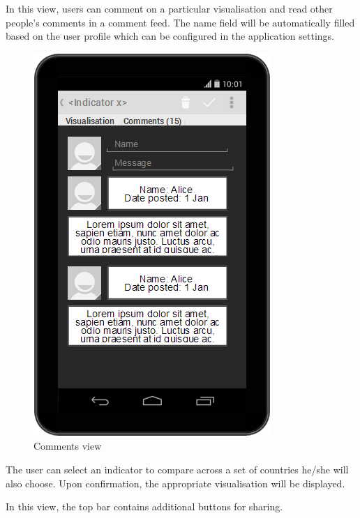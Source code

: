 \documentclass[12pt,a4paper,twoside]{article}
\begin{document}
In this view, users can comment on a particular visualisation and read other people's comments in a comment feed. The name field will be automatically filled based on the user profile which can be configured in the application settings.

\begin{figure}[H]
\centering
\includegraphics[scale=0.4]{mocks/comments.png}
\caption{Comments view}
\end{figure}

The user can select an indicator to compare across a set of countries he/she will also choose. Upon confirmation, the appropriate visualisation will be displayed.

In this view, the top bar contains additional buttons for sharing.
\end{document}
